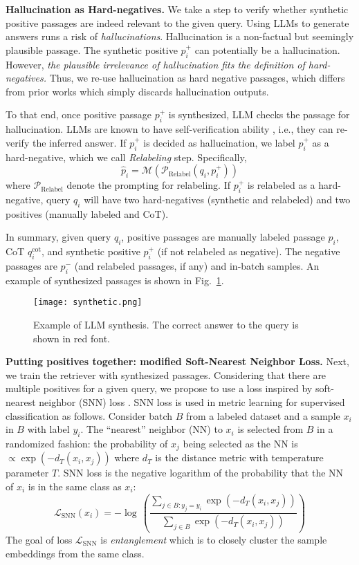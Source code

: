 \noindent\textbf{Hallucination as Hard-negatives.} We take a step to verify whether synthetic positive passages are indeed relevant to the given query. Using LLMs to generate answers runs a risk of \emph{hallucinations}. Hallucination is a non-factual but seemingly plausible passage. The synthetic positive $p_i^+$ can potentially be a hallucination. However, \emph{the plausible irrelevance of hallucination fits the definition of hard-negatives.} Thus, we re-use hallucination as hard negative passages, which differs from prior works \cite{weng2023large,  madaan2024self} 
which simply discards hallucination outputs.  

To that end, once positive passage $p_i^+$ is synthesized, LLM checks the passage for hallucination. LLMs are known to have self-verification ability \cite{weng2023large}, i.e., they can re-verify the inferred answer. If $p_i^+$ is decided as hallucination, we label $p_i^+$ as a hard-negative, which we call \emph{Relabeling} step. Specifically,
\begin{equation}
     \hat p_i = \mathcal{M}(\mathcal{P}_{\mathrm{Relabel}}(q_i, p_i^+))
\end{equation}
where $\mathcal{P}_{\mathrm{Relabel}}$ denote the prompting for relabeling.
If $p_i^+$ is relabeled as a hard-negative,  query $q_i$ will have two hard-negatives (synthetic and relabeled) and two positives (manually labeled and CoT).

In summary, given query $q_i$, positive passages are manually labeled passage $p_i$, CoT $q_i^\text{cot}$, and synthetic positive $p_i^+$ (if not relabeled as negative). The negative passages are $p_i^-$ (and relabeled passages, if any) and in-batch samples. An example of synthesized passages is shown in Fig.~\ref{fig:synthetic}.

\begin{figure}[t!]
\centering
    \texttt{[image: synthetic.png]}
    \caption{Example of LLM synthesis. The correct answer to the query is shown in red font.} 
    \label{fig:synthetic}
\end{figure}


\noindent\textbf{Putting positives together: modified Soft-Nearest Neighbor Loss.}
Next, we train the retriever with synthesized passages. Considering that there are multiple positives for a given query, we propose to use a loss inspired by soft-nearest neighbor (SNN) loss \cite{frosst2019analyzing}. SNN loss is used in metric learning for supervised classification as follows. Consider batch $B$ from a labeled dataset and a sample $x_i$ in  $B$ with label $y_i$.  The ``nearest'' neighbor (NN) to $x_i$ is selected from $B$ in a randomized fashion: the probability of $x_j$ being selected as the NN is $\propto \exp(-d_T(x_i,x_j))$ where $d_T$ is the distance metric with temperature parameter $T$. SNN loss is the negative logarithm of the probability that the NN of $x_i$ is in the same class as $x_i$:
\[
\mathcal L_{\text{SNN}}(x_i)=-\log\,\left(\dfrac{\sum_{j\in B:y_j=y_i}\exp(-d_T(x_i,x_j))}{\sum_{j\in B}\exp(-d_T(x_i,x_j))}\right)
\]
 The goal of loss $\mathcal L_{\text{SNN}}$ is \emph{entanglement} \cite{frosst2019analyzing} which is to closely cluster the sample embeddings from the same class.  

